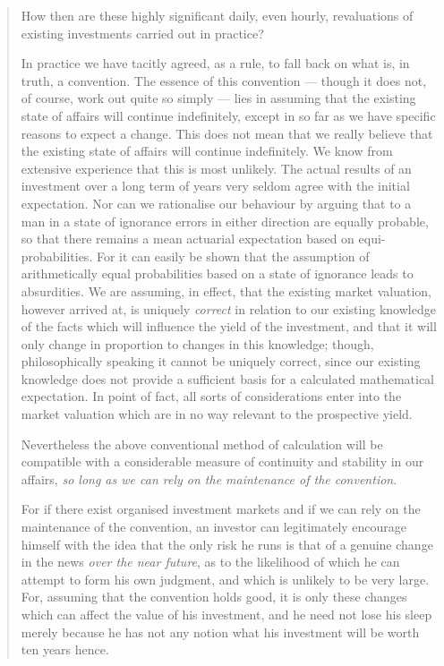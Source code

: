 \documentclass[
  11pt,
  letterpaper,
  DIV=11,
  numbers=noendperiod,
  oneside]{scrartcl}
\begin{document}
\begin{quote}
How then are these highly significant daily, even hourly, revaluations
of existing investments carried out in practice?

In practice we have tacitly agreed, as a rule, to fall back on what is,
in truth, a convention. The essence of this convention --- though it
does not, of course, work out quite so simply --- lies in assuming that
the existing state of affairs will continue indefinitely, except in so
far as we have specific reasons to expect a change. This does not mean that we really believe that the
existing state of affairs will continue indefinitely. We know from
extensive experience that this is most unlikely. The actual results of
an investment over a long term of years very seldom agree with the
initial expectation. Nor can we rationalise our behaviour by arguing
that to a man in a state of ignorance errors in either direction are
equally probable, so that there remains a mean actuarial expectation
based on equi-probabilities. For it can easily be shown that the
assumption of arithmetically equal probabilities based on a state of
ignorance leads to absurdities. We are assuming, in effect, that the existing
market valuation, however arrived at, is uniquely \emph{correct} in
relation to our existing knowledge of the facts which will influence the
yield of the investment, and that it will only change in proportion to
changes in this knowledge; though, philosophically speaking it cannot be
uniquely correct, since our existing knowledge does not provide a
sufficient basis for a calculated mathematical expectation. In point of fact, all sorts of considerations enter into
the market valuation which are in no way relevant to the prospective
yield.

Nevertheless the above conventional method of calculation will be
compatible with a considerable measure of continuity and stability in
our affairs, \emph{so long as we can rely on the maintenance of the
convention}.

For if there exist organised investment markets and if we can rely on
the maintenance of the convention, an investor can legitimately
encourage himself with the idea that the only risk he runs is that of a
genuine change in the news \emph{over the near future}, as to the
likelihood of which he can attempt to form his own judgment, and which
is unlikely to be very large. For, assuming that the convention
holds good, it is only these changes which can affect the value of his
investment, and he need not lose his sleep merely because he has not any
notion what his investment will be worth ten years hence.
\end{quote}
\end{document}
